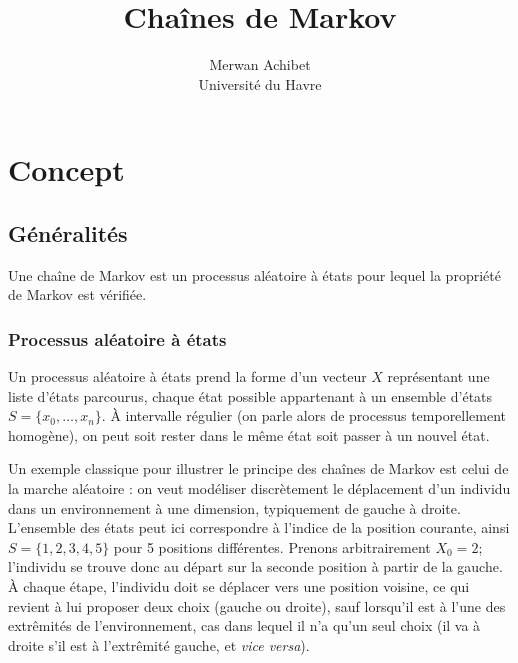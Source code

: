 \documentclass[12pt]{article}
\title{Chaînes de Markov} \author{Merwan Achibet\\Université du Havre}
\date{}
\begin{document}
\maketitle

\section{Concept}

\subsection{Généralités}

Une chaîne de Markov est un processus aléatoire à états pour lequel la
propriété de Markov est vérifiée.

\subsubsection{Processus aléatoire à états}

Un processus aléatoire à états prend la forme d'un vecteur $X$
représentant une liste d'états parcourus, chaque état possible
appartenant à un ensemble d'états $S = \{x_0, \dots, x_n \}$. \`A
intervalle régulier (on parle alors de processus temporellement
homogène), on peut soit rester dans le même état soit passer à un
nouvel état.

Un exemple classique pour illustrer le principe des chaînes de Markov
est celui de la marche aléatoire \cite{ocone} : on veut modéliser
discrètement le déplacement d'un individu dans un environnement à une
dimension, typiquement de gauche à droite. L'ensemble des états peut
ici correspondre à l'indice de la position courante, ainsi $S = \{1,
2, 3, 4, 5\}$ pour 5 positions différentes. Prenons arbitrairement
$X_0 = 2$; l'individu se trouve donc au départ sur la seconde position
à partir de la gauche. \`A chaque étape, l'individu doit se déplacer
vers une position voisine, ce qui revient à lui proposer deux choix
(gauche ou droite), sauf lorsqu'il est à l'une des extrêmités de
l'environnement, cas dans lequel il n'a qu'un seul choix (il va à
droite s'il est à l'extrêmité gauche, et \textit{vice versa}).
\end{document}
